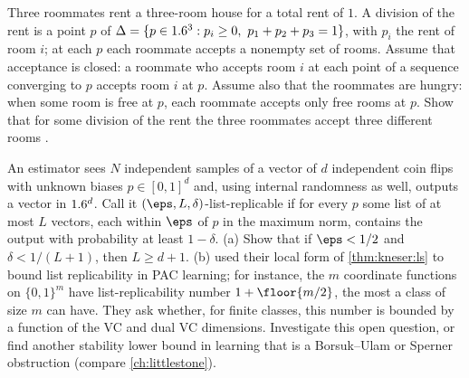 \begin{refsection}
\begin{exercises}
\item \transfer\harder\label{ex:kneser:rental} Three roommates rent a three-room house for a total rent of $1$. A division of the rent is a point $p$ of $\Delta=\{p\in\R^3:p_i\ge0,\ p_1+p_2+p_3=1\}$, with $p_i$ the rent of room $i$; at each $p$ each roommate accepts a nonempty set of rooms. Assume that acceptance is closed: a roommate who accepts room $i$ at each point of a sequence converging to $p$ accepts room $i$ at $p$. Assume also that the roommates are hungry: when some room is free at $p$, each roommate accepts only free rooms at $p$. Show that for some division of the rent the three roommates accept three different rooms \parencite{Su1999}. 

\item \research\harder\label{ex:kneser:replicable} An estimator sees $N$ independent samples of a vector of $d$ independent coin flips with unknown biases $p\in[0,1]^d$ and, using internal randomness as well, outputs a vector in $1.6^d$. Call it $(\eps,L,\delta)$-list-replicable if for every $p$ some list of at most $L$ vectors, each within $\eps$ of $p$ in the maximum norm, contains the output with probability at least $1-\delta$. (a) Show that if $\eps<1/2$ and $\delta<1/(L+1)$, then $L\ge d+1$. (b) \textcite{ChaseEtAl2024} used their local form of \cref{thm:kneser:ls} to bound list replicability in PAC learning; for instance, the $m$ coordinate functions on $\{0,1\}^m$ have list-replicability number $1+\floor{m/2}$, the most a class of size $m$ can have. They ask whether, for finite classes, this number is bounded by a function of the VC and dual VC dimensions. Investigate this open question, or find another stability lower bound in learning that is a Borsuk--Ulam or Sperner obstruction (compare \cref{ch:littlestone}). 
\end{exercises}


\end{refsection}
